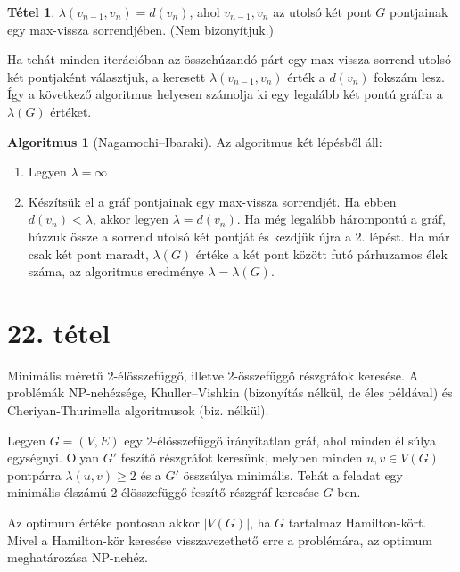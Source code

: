 \documentclass{article}
\theoremstyle{definition}
\newtheorem*{tetel}{Tétel}
\newtheorem*{algoritmus}{Algoritmus}
\begin{document}
\begin{tetel}
$\lambda(v_{n-1}, v_n) = d(v_n)$, ahol $v_{n-1}, v_n$ az utolsó két pont $G$ pontjainak egy max-vissza sorrendjében. (Nem bizonyítjuk.)
\end{tetel}

Ha tehát minden iterációban az összehúzandó párt egy max-vissza sorrend utolsó két pontjaként választjuk, a keresett $\lambda(v_{n-1}, v_n)$ érték a $d(v_n)$ fokszám lesz. Így a következő algoritmus helyesen számolja ki egy legalább két pontú gráfra a $\lambda(G)$ értéket. 

\begin{algoritmus}[Nagamochi--Ibaraki] Az algoritmus két lépésből áll:
\begin{enumerate}
  \item Legyen $\lambda = \infty$
  \item Készítsük el a gráf pontjainak egy max-vissza sorrendjét. Ha ebben $d(v_n) < \lambda$, akkor legyen $\lambda = d(v_n)$. Ha még legalább hárompontú a gráf, húzzuk össze a sorrend utolsó két pontját és kezdjük újra a 2. lépést. Ha már csak két pont maradt, $\lambda(G)$ értéke a két pont között futó párhuzamos élek száma, az algoritmus eredménye $\lambda = \lambda(G)$.
\end{enumerate}
\end{algoritmus}


\section*{22. tétel}
\begin{framed}
Minimális méretű 2-élösszefüggő, illetve 2-összefüggő részgráfok keresése. A problémák NP-nehézsége, Khuller--Vishkin (bizonyítás nélkül, de éles példával) és Cheriyan-Thurimella algoritmusok (biz. nélkül).
\end{framed}

Legyen $G=(V,E)$ egy 2-élösszefüggő irányítatlan gráf, ahol minden él súlya egységnyi. Olyan $G'$ feszítő részgráfot keresünk, melyben minden $u, v \in V(G)$ pontpárra $\lambda(u, v) \geq 2$ és a $G'$ összsúlya minimális. Tehát a feladat egy minimális élszámú 2-élösszefüggő feszítő részgráf keresése $G$-ben.

Az optimum értéke pontosan akkor $|V(G)|$, ha $G$ tartalmaz Hamilton-kört. Mivel a Hamilton-kör keresése visszavezethető erre a problémára, az optimum meghatározása NP-nehéz.
\end{document}

